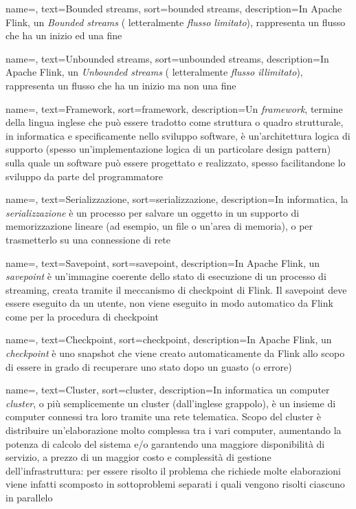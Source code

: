 {
    name=,
    text=Bounded streams,
    sort=bounded streams,
    description={In Apache Flink, un \textit{Bounded streams} ( letteralmente \textit{flusso limitato}), rappresenta un flusso che ha un inizio ed una fine}
}

{
    name=,
    text=Unbounded streams,
    sort=unbounded streams,
    description={In Apache Flink, un \textit{Unbounded streams} ( letteralmente \textit{flusso illimitato}), rappresenta un flusso che ha un inizio ma non una fine}
}

{
    name=,
    text=Framework,
    sort=framework,
    description={Un \textit{framework}, termine della lingua inglese che può essere tradotto come struttura o quadro strutturale, in informatica e specificamente nello sviluppo software, è un'architettura logica di supporto (spesso un'implementazione logica di un particolare design pattern) sulla quale un software può essere progettato e realizzato, spesso facilitandone lo sviluppo da parte del programmatore}
}


{
    name=,
    text=Serializzazione,
    sort=serializzazione,
    description={In informatica, la \textit{serializzazione} è un processo per salvare un oggetto in un supporto di memorizzazione lineare (ad esempio, un file o un'area di memoria), o per trasmetterlo su una connessione di rete}
}

{
    name=,
    text=Savepoint,
    sort=savepoint,
    description={In Apache Flink, un \textit{savepoint} è un'immagine coerente dello stato di esecuzione di un processo di streaming, creata tramite il meccanismo di \gls{checkpoint} di Flink. Il savepoint deve essere eseguito da un utente, non viene eseguito in modo automatico da Flink come per la procedura di \gls{checkpoint}}
}


{
    name=,
    text=Checkpoint,
    sort=checkpoint,
    description={In Apache Flink, un \textit{checkpoint} è uno snapshot che viene creato automaticamente da Flink allo scopo di essere in grado di recuperare uno stato dopo un guasto (o errore)}
}

{
    name=,
    text=Cluster,
    sort=cluster,
    description={In informatica un computer \textit{cluster}, o più semplicemente un cluster (dall'inglese grappolo), è un insieme di computer connessi tra loro tramite una rete telematica. Scopo del cluster è distribuire un'elaborazione molto complessa tra i vari computer, aumentando la potenza di calcolo del sistema e/o garantendo una maggiore disponibilità di servizio, a prezzo di un maggior costo e complessità di gestione dell'infrastruttura: per essere risolto il problema che richiede molte elaborazioni viene infatti scomposto in sottoproblemi separati i quali vengono risolti ciascuno in parallelo}
}


